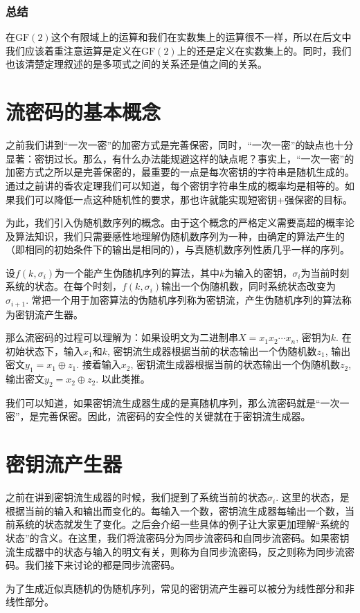 \documentclass[UTF8]{ctexrep}
\def\pth#1{\left( {#1}\right)}
\def\GF{\mathrm{GF}}
\begin{document}
\subsubsection{总结}
在$\GF\pth{2}$这个有限域上的运算和我们在实数集上的运算很不一样，所以在后文中我们应该着重注意运算是定义在$\GF\pth{2}$上的还是定义在实数集上的。同时，我们也该清楚定理叙述的是多项式之间的关系还是值之间的关系。
\section{流密码的基本概念}
之前我们讲到“一次一密”的加密方式是完善保密，同时，“一次一密”的缺点也十分显著：密钥过长。那么，有什么办法能规避这样的缺点呢？事实上，“一次一密”的加密方式之所以是完善保密的，最重要的一点是每次密钥的字符串是随机生成的。通过之前讲的香农定理我们可以知道，每个密钥字符串生成的概率均是相等的。如果我们可以降低一点这种随机性的要求，那也许就能实现短密钥+强保密的目标。\par
为此，我们引入伪随机数序列的概念。由于这个概念的严格定义需要高超的概率论及算法知识，我们只需要感性地理解伪随机数序列为一种，由确定的算法产生的（即相同的初始条件下的输出是相同的），与真随机数序列性质几乎一样的序列。\par
设$f(k, \sigma_i)$为一个能产生伪随机序列的算法，其中$k$为输入的密钥，$\sigma_i$为当前时刻系统的状态。在每个时刻，$f(k, \sigma_i)$输出一个伪随机数，同时系统状态改变为$\sigma_{i+1}$. 常把一个用于加密算法的伪随机序列称为密钥流，产生伪随机序列的算法称为密钥流产生器。\par
那么流密码的过程可以理解为：如果设明文为二进制串$X=x_1x_2\cdots x_n$, 密钥为$k$. 在初始状态下，输入$x_1$和$k$, 密钥流生成器根据当前的状态输出一个伪随机数$z_1$, 输出密文$y_1=x_1\oplus z_1$. 接着输入$x_2$, 密钥流生成器根据当前的状态输出一个伪随机数$z_2$, 输出密文$y_2=x_2\oplus z_2$. 以此类推。\par
我们可以知道，如果密钥流生成器生成的是真随机序列，那么流密码就是“一次一密”，是完善保密。因此，流密码的安全性的关键就在于密钥流生成器。
\section{密钥流产生器}
之前在讲到密钥流生成器的时候，我们提到了系统当前的状态$\sigma_i$. 这里的状态，是根据当前的输入和输出而变化的。每输入一个数，密钥流生成器每输出一个数，当前系统的状态就发生了变化。之后会介绍一些具体的例子让大家更加理解“系统的状态”的含义。在这里，我们将流密码分为同步流密码和自同步流密码。如果密钥流生成器中的状态与输入的明文有关，则称为自同步流密码，反之则称为同步流密码。我们接下来讨论的都是同步流密码。\par
为了生成近似真随机的伪随机序列，常见的密钥流产生器可以被分为线性部分和非线性部分。
\end{document}
